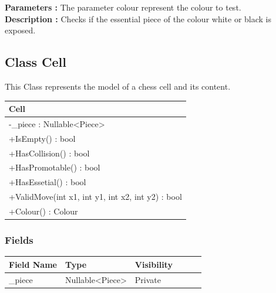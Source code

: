 \documentclass[12pt]{article}
\begin{document}
\textbf{Parameters :} The parameter colour represent the colour
to test.
\\

\textbf{Description :} Checks if the essential piece of the colour white or black
is exposed.

\newpage


\subsection{Class Cell}

This Class represents the model of a chess cell and its content.

\begin{table}[H]
    \begin{tabular}{|l|}
    \hline
    \rowcolor[HTML]{C0C0C0} 
    \textbf{Cell}                                    \\ \hline
    \rowcolor[HTML]{EFEFEF}
    -\_piece : Nullable<Piece>                        \\ \hline
    +IsEmpty() : bool                                 \\ \hline
    +HasCollision() : bool                            \\ \hline
    +HasPromotable() : bool                           \\ \hline
    +HasEssetial() : bool                             \\ \hline
    +ValidMove(int x1, int y1, int x2, int y2) : bool \\ \hline
    +Colour() : Colour                                \\ \hline
    \end{tabular}
\end{table}

\subsubsection{Fields}

\begin{table}[H]
    \begin{tabular}{llllll}
    \hline
    \multicolumn{1}{|l|}{\cellcolor[HTML]{EFEFEF}\textbf{Field Name}} & \multicolumn{1}{l|}{\cellcolor[HTML]{EFEFEF}\textbf{Type}} & \multicolumn{1}{l|}{\cellcolor[HTML]{EFEFEF}\textbf{Visibility}} \\ \hline
    \multicolumn{1}{|l|}{\_piece}                                     & \multicolumn{1}{l|}{Nullable<Piece>}                       & \multicolumn{1}{l|}{Private}                                     \\ \hline
    \end{tabular}
\end{table}
\end{document}
